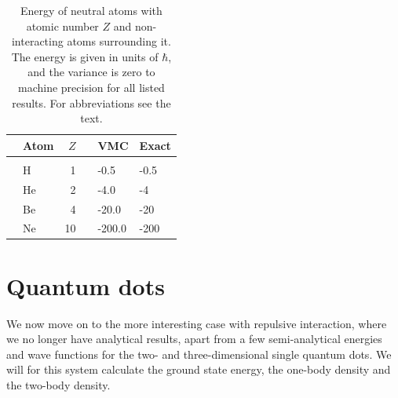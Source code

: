 \begin{table}[H]
	\caption{Energy of neutral atoms with atomic number $Z$ and non-interacting atoms surrounding it. The energy is given in units of $\hbar$, and the variance is zero to machine precision for all listed results. For abbreviations see the text.}
	\label{tab:atomswointeraction}
	\begin{tabularx}{\textwidth}{R{3.5cm}lrrR{2.5cm}R{2.5cm}} \hline\hline
		& Atom & $Z$ & \makecell{\\ \phantom{=}} & VMC & Exact \\ \hline \\
		
		& H & 1 && -0.5 & -0.5 \\
		& He & 2 && -4.0 & -4 \\
		& Be & 4 && -20.0 & -20 \\
		& Ne & 10 && -200.0 & -200 \\ \hline\hline
	\end{tabularx}
\end{table}

\cleardoublepage
\section{Quantum dots}
We now move on to the more interesting case with repulsive interaction, where we no longer have analytical results, apart from a few semi-analytical energies and wave functions  for the two- and three-dimensional single quantum dots. We will for this system calculate the ground state energy, the one-body density and the two-body density. 

